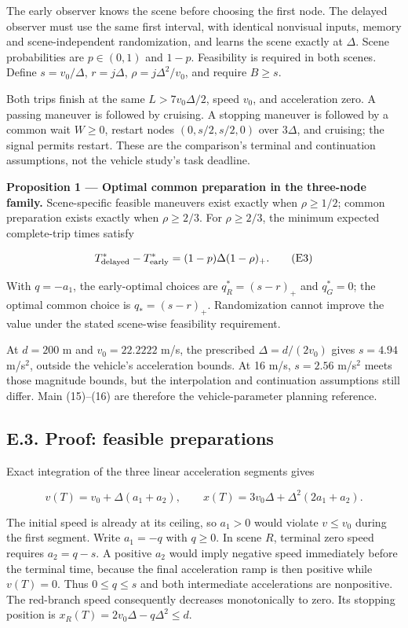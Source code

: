 \documentclass[letterpaper,journal,onecolumn]{IEEEtran}
\begin{document}
The early observer knows the scene before choosing the first node. The delayed observer must use the same first interval, with identical nonvisual inputs, memory and scene-independent randomization, and learns the scene exactly at \(\Delta\). Scene probabilities are \(p\in(0,1)\) and \(1-p\). Feasibility is required in both scenes. Define \(s=v_0/\Delta\), \(r=j\Delta\), \(\rho=j\Delta^2/v_0\), and require \(B\ge s\).

Both trips finish at the same \(L>7v_0\Delta/2\), speed \(v_0\), and acceleration zero. A passing maneuver is followed by cruising. A stopping maneuver is followed by a common wait \(W\ge0\), restart nodes \((0,s/2,s/2,0)\) over \(3\Delta\), and cruising; the signal permits restart. These are the comparison's terminal and continuation assumptions, not the vehicle study's task deadline.

\textbf{Proposition 1 --- Optimal common preparation in the three-node family.} Scene-specific feasible maneuvers exist exactly when \(\rho\ge1/2\); common preparation exists exactly when \(\rho\ge2/3\). For \(\rho\ge2/3\), the minimum expected complete-trip times satisfy

\[T^*_{\rm delayed}-T^*_{\rm early}=(1-p)\Delta(1-\rho)_+.\tag{E3}\]

With \(q=-a_1\), the early-optimal choices are \(q_R^*=(s-r)_+\) and \(q_G^*=0\); the optimal common choice is \(q_*=(s-r)_+\). Randomization cannot improve the value under the stated scene-wise feasibility requirement.

At \(d=200\) m and \(v_0=22.2222\) m/s, the prescribed \(\Delta=d/(2v_0)\) gives \(s=4.94\) m/s\(^2\), outside the vehicle's acceleration bounds. At 16 m/s, \(s=2.56\) m/s\(^2\) meets those magnitude bounds, but the interpolation and continuation assumptions still differ. Main (15)--(16) are therefore the vehicle-parameter planning reference.

\subsection*{E.3. Proof: feasible preparations}

Exact integration of the three linear acceleration segments gives

\[
v(T)=v_0+\Delta(a_1+a_2),\qquad
x(T)=3v_0\Delta+\Delta^2(2a_1+a_2).
\tag{E4}
\]

The initial speed is already at its ceiling, so \(a_1>0\) would violate \(v\le v_0\) during the first segment. Write \(a_1=-q\) with \(q\ge0\). In scene \(R\), terminal zero speed requires \(a_2=q-s\). A positive \(a_2\) would imply negative speed immediately before the terminal time, because the final acceleration ramp is then positive while \(v(T)=0\). Thus \(0\le q\le s\) and both intermediate accelerations are nonpositive. The red-branch speed consequently decreases monotonically to zero. Its stopping position is \(x_R(T)=2v_0\Delta-q\Delta^2\le d\).
\end{document}
